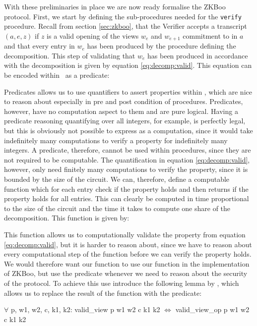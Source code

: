 With these preliminaries in place we are now ready formalise the ZKBoo protocol.
First, we start by defining the sub-procedures needed for the \texttt{verify}
procedure. Recall from section \ref{sec:zkboo}, that the Verifier accepts a
transcript $(a,e,z)$ if $z$ is a valid opening of the views $w_{e}$ and
$w_{e+1}$ commitment to in $a$ and that every entry in $w_{e}$ has been produced
by the procedure defining the decomposition. This step of validating that
$w_{e}$ has been produced in accordance with the decomposition is given 
by equation \ref{eq:decomp:valid}.
%
This equation can be encoded within \easycrypt\ as a predicate:


Predicates allows us to use quantifiers to assert properties within \easycrypt , which are nice to
reason about especially in pre and post condition of procedures. Predicates,
however, have no computation aspect to them and are pure logical.
Having a predicate reasoning quantifying over all integers, for example, is
perfectly legal, but this is obviously not possible to express as a computation,
since it would take indefinitely many computations to verify a property for
indefinitely many integers.
A predicate, therefore, cannot be used within procedures, since they are not
required to be computable.
The quantification in equation \ref{eq:decomp:valid}, however, only need
finitely many computations to verify the property, since it is bounded by the
size of the circuit. We can, therefore, define a computable function which for
each entry check if the property holds and then returns if the property holds
for all entries. This can clearly be computed in time proportional to the size
of the circuit and the time it takes to compute one share of the decomposition.
This function is given by:


This function allows us to computationally validate the property from equation
\ref{eq:decomp:valid}, but it is harder to reason about, since we have
to reason about every computational step of the function before we can verify
the property holds. We would therefore want our function to use our function in
the implementation of ZKBoo, but use the predicate whenever we need to reason
about the security of the protocol.
To achieve this use introduce the following lemma by \citet{Yao},
which allows us to replace the result of the function with the predicate:
\begin{lemma}
  $\forall$ p, w1, w2, c, k1, k2:
  valid\_view p w1 w2 c k1 k2 $\iff$ valid\_view\_op p w1 w2 c k1 k2
\end{lemma}

